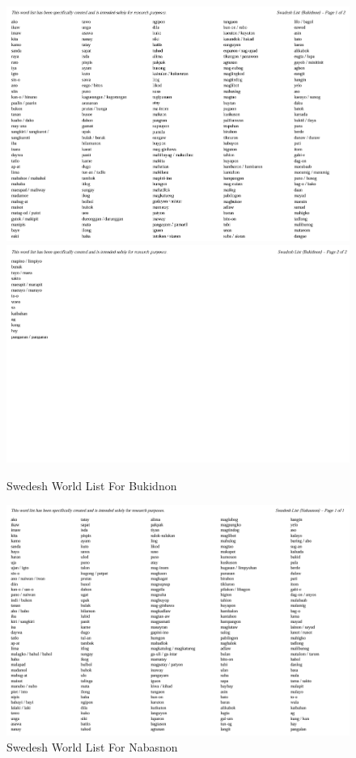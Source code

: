 \begin{figure}[h!]
	\centering
	\includegraphics[width=\textwidth]{./appendix/swadesh_bukidnon1.png}
	\includegraphics[width=\textwidth]{./appendix/swadesh_bukidnon2.png}
	\caption{Swedesh World List For Bukidnon}
	\label{fig:swadeshBukidnon}
\end{figure}

\begin{figure}[h!]
	\centering
	\includegraphics[width=\textwidth]{./appendix/swadesh_nabasnon.png}
	\caption{Swedesh World List For Nabasnon}
	\label{fig:swadeshNabasnon}
\end{figure}

